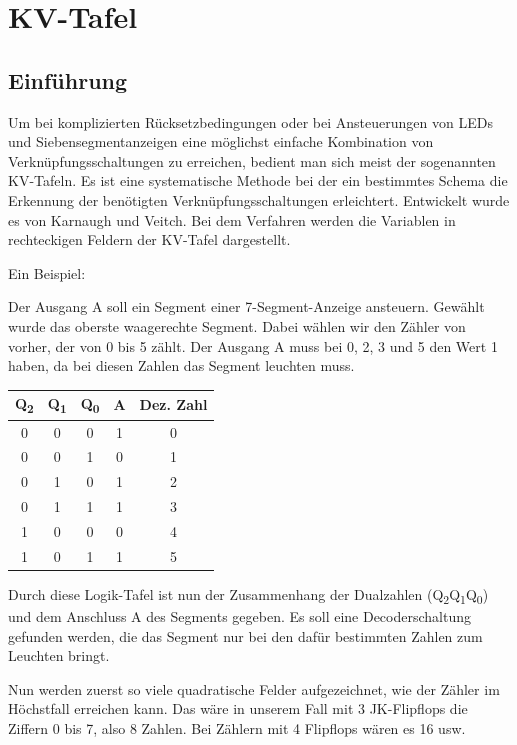 \chapter{KV-Tafel}

\section{Einführung}

Um bei komplizierten Rücksetzbedingungen oder bei Ansteuerungen von LEDs und Siebensegmentanzeigen eine möglichst einfache Kombination von Verknüpfungsschaltungen zu erreichen, bedient man sich meist der sogenannten KV-Tafeln. Es ist eine systematische Methode bei der ein bestimmtes Schema die Erkennung der benötigten Verknüpfungsschaltungen erleichtert. Entwickelt wurde es von Karnaugh und Veitch. Bei dem Verfahren werden die Variablen in rechteckigen Feldern der KV-Tafel dargestellt.

Ein Beispiel:

Der Ausgang A soll ein Segment einer 7-Segment-Anzeige ansteuern. Gewählt wurde das oberste waagerechte Segment. Dabei wählen wir den Zähler von vorher, der von 0 bis 5 zählt. Der Ausgang A muss bei 0, 2, 3 und 5 den Wert 1 haben, da bei diesen Zahlen das Segment leuchten muss.

\begin{table}[htbp]
  \centering
  \begin{tabular}{ccccc}
    \toprule
    Q\textsubscript{2} & Q\textsubscript{1} & Q\textsubscript{0} & A & Dez. Zahl \\
    \midrule
    0 & 0 & 0 & 1 & 0 \\
    0 & 0 & 1 & 0 & 1 \\
    0 & 1 & 0 & 1 & 2 \\
    0 & 1 & 1 & 1 & 3 \\
    1 & 0 & 0 & 0 & 4 \\
    1 & 0 & 1 & 1 & 5 \\
    \bottomrule
  \end{tabular}
\end{table}

Durch diese Logik-Tafel ist nun der Zusammenhang der Dualzahlen (Q\textsubscript{2}Q\textsubscript{1}Q\textsubscript{0}) und dem Anschluss A des Segments gegeben. Es soll eine Decoderschaltung gefunden werden, die das Segment nur bei den dafür bestimmten Zahlen zum Leuchten bringt.

Nun werden zuerst so viele quadratische Felder aufgezeichnet, wie der Zähler im Höchstfall erreichen kann. Das wäre in unserem Fall mit 3 JK-Flipflops die Ziffern 0 bis 7, also 8 Zahlen. Bei Zählern mit 4 Flipflops wären es 16 usw.

